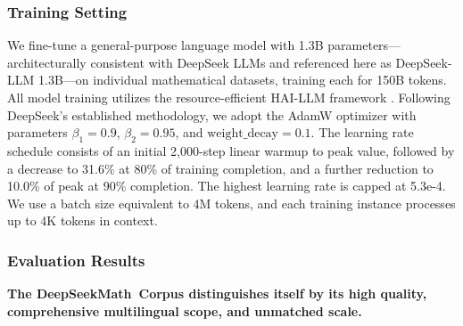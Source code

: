 \begin{itemize}[topsep=0pt]
\subsubsection{Training Setting}
\label{sec:quality-policy}
We fine-tune a general-purpose language model with 1.3B parameters—architecturally consistent with DeepSeek LLMs \citep{deepseek-llm} and referenced here as DeepSeek-LLM 1.3B—on individual mathematical datasets, training each for 150B tokens. All model training utilizes the resource-efficient HAI-LLM framework \citep{haillm}. Following DeepSeek’s established methodology, we adopt the AdamW optimizer \citep{adamW} with parameters $\beta_1=0.9$, $\beta_2=0.95$, and $\mathrm{weight\_decay}=0.1$. The learning rate schedule consists of an initial 2,000-step linear warmup to peak value, followed by a decrease to 31.6\% at 80\% of training completion, and a further reduction to 10.0\% of peak at 90\% completion. The highest learning rate is capped at 5.3e-4. We use a batch size equivalent to 4M tokens, and each training instance processes up to 4K tokens in context.

\subsubsection{Evaluation Results}

\textbf{The DeepSeekMath~Corpus distinguishes itself by its high quality, comprehensive multilingual scope, and unmatched scale.}


\end{itemize}
